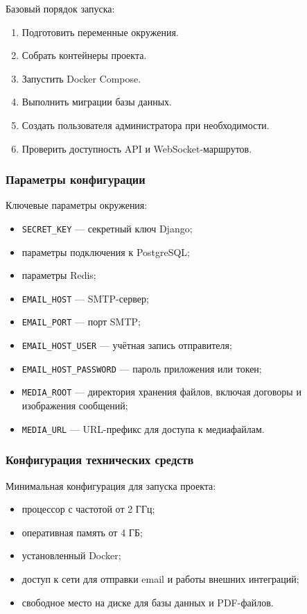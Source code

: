 Базовый порядок запуска:
\begin{enumerate}
    \item Подготовить переменные окружения.
    \item Собрать контейнеры проекта.
    \item Запустить Docker Compose.
    \item Выполнить миграции базы данных.
    \item Создать пользователя администратора при необходимости.
    \item Проверить доступность API и WebSocket-маршрутов.
\end{enumerate}

\subsubsection{Параметры конфигурации}
Ключевые параметры окружения:
\begin{itemize}
    \item \texttt{SECRET\_KEY} --- секретный ключ Django;
    \item параметры подключения к PostgreSQL;
    \item параметры Redis;
    \item \texttt{EMAIL\_HOST} --- SMTP-сервер;
    \item \texttt{EMAIL\_PORT} --- порт SMTP;
    \item \texttt{EMAIL\_HOST\_USER} --- учётная запись отправителя;
    \item \texttt{EMAIL\_HOST\_PASSWORD} --- пароль приложения или токен;
    \item \texttt{MEDIA\_ROOT} --- директория хранения файлов, включая договоры и изображения сообщений;
    \item \texttt{MEDIA\_URL} --- URL-префикс для доступа к медиафайлам.
\end{itemize}

\subsubsection{Конфигурация технических средств}
Минимальная конфигурация для запуска проекта:
\begin{itemize}
    \item процессор с частотой от 2 ГГц;
    \item оперативная память от 4 ГБ;
    \item установленный Docker;
    \item доступ к сети для отправки email и работы внешних интеграций;
    \item свободное место на диске для базы данных и PDF-файлов.
\end{itemize}

